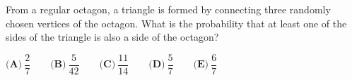 From a regular octagon, a triangle is formed by connecting three randomly chosen vertices of the octagon. What is the probability that at least one of the sides of the triangle is also a side of the octagon?

$\textbf{(A)}\ \dfrac{2}{7}\qquad\textbf{(B)}\ \dfrac{5}{42}\qquad\textbf{(C)}\ \dfrac{11}{14}\qquad\textbf{(D)}\ \dfrac{5}{7}\qquad\textbf{(E)}\ \dfrac{6}{7}$
